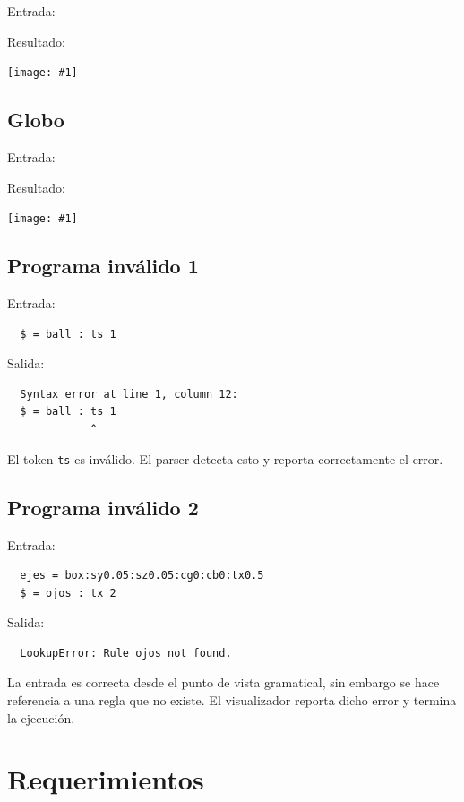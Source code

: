 \documentclass[a4paper, 10pt, twoside]{article}
\newcommand{\grafico}[1]{
  \begin{center}
    \texttt{[image: \#1]}
  \end{center}
}
\begin{document}
Entrada:



Resultado:

\grafico{dickbutt.png}


\subsection{Globo}

Entrada:



Resultado:

\grafico{ejemplo23.png}


\subsection{Programa inválido 1}

Entrada:

\begin{verbatim}
  $ = ball : ts 1
\end{verbatim}

Salida:

\begin{verbatim}
  Syntax error at line 1, column 12:
  $ = ball : ts 1
             ^
\end{verbatim}

El token \texttt{ts} es inválido. El parser detecta esto y reporta correctamente el error.


\subsection{Programa inválido 2}

Entrada:

\begin{verbatim}
  ejes = box:sy0.05:sz0.05:cg0:cb0:tx0.5
  $ = ojos : tx 2
\end{verbatim}

Salida:

\begin{verbatim}
  LookupError: Rule ojos not found.
\end{verbatim}

La entrada es correcta desde el punto de vista gramatical, sin embargo se hace referencia a una regla que no existe. El visualizador reporta dicho error y termina la ejecución.


\section{Requerimientos}
\end{document}
